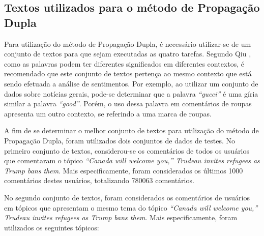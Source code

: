 \subsection{Textos utilizados para o método de Propagação Dupla}
\label{sec:textos}

Para utilização do método de Propagação Dupla, é necessário utilizar-se de um
conjunto de textos para que sejam executadas as quatro tarefas. Segundo Qiu
\cite{Qiu:2011:OWE:1970420.1970422}, como as palavras podem ter diferentes
significados em diferentes contextos, é recomendado que este conjunto de textos pertença ao mesmo contexto que está sendo efetuada a análise de sentimentos. Por
exemplo, ao utilizar um conjunto de dados sobre notícias gerais, pode-se
determinar que a palavra \textit{``gucci''} é uma gíria similar a palavra
\textit{``good''}. Porém, o uso dessa palavra em comentários de roupas
apresenta um outro contexto, se referindo a uma marca de roupas.

A fim de se determinar o melhor conjunto de textos para utilização do método de
Propagação Dupla, foram utilizados dois conjuntos de dados de testes. No
primeiro conjunto de textos, considerou-se os comentários de todos os usuários
que comentaram o tópico \textit{``Canada will welcome you,” Trudeau invites
refugees as Trump bans them}. Mais especificamente, foram considerados os
últimos 1000 comentários destes usuários, totalizando 780063 comentários.

No segundo
conjunto de textos, foram considerados os comentários de usuários em tópicos
que apresentam o mesmo tema do tópico \textit{``Canada will welcome you,” Trudeau invites
refugees as Trump bans them}. Mais especificamente, foram utilizados os
seguintes tópicos:

